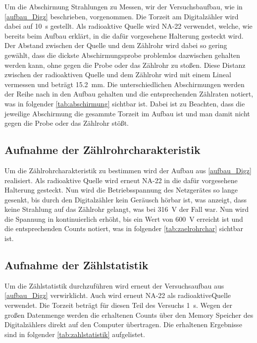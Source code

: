 \documentclass[12pt,english,ngerman]{scrartcl}
\begin{document}
Um die Abschirmung Strahlungen zu Messen, wir der Versuchsbaufbau, wie in \autoref{aufbau_Digz} beschrieben, vorgenommen. 
Die Torzeit am Digitalzähler wird dabei auf \SI{10}{\second} gestellt. Als radioaktive Quelle wird NA-22 verwendet, welche, wie 
bereits beim Aufbau erklärt, in die dafür vorgesehene Halterung gesteckt wird. Der Abstand zwischen der Quelle und dem Zählrohr
wird dabei so gering gewählt, dass die dickste Abschirmungsprobe problemlos dazwischen gehalten werden kann, ohne gegen
die Probe oder das Zählrohr zu stoßen. Diese Distanz zwischen der radioaktiven Quelle und dem Zählrohr wird mit einem Lineal
vermessen und beträgt \SI{15,2}{\mm}. Die unterschiedlichen Abschirmungen werden der Reihe nach in den Aufbau gehalten und die 
entsprechenden Zählraten notiert, was in folgender \autoref{tab:abschirmung} sichtbar ist. Dabei ist zu Beachten, dass die 
jeweilige Abschirmung die gesammte Torzeit im Aufbau ist und man damit nicht gegen die Probe oder das Zählrohr stößt.


\subsection{Aufnahme der Zählrohrcharakteristik}

Um die Zählrohrcharakteristik zu bestimmen wird der Aufbau aus \autoref{aufbau_Digz} realisiert.
Als radioaktive Quelle wird erneut NA-22 in die dafür vorgesehene Halterung gesteckt. Nun wird die Betriebsspannung des
Netzgerätes so lange gesenkt, bis durch den Digitalzähler kein Geräusch hörbar ist, was anzeigt, dass keine Strahlung auf das 
Zählrohr gelangt, was bei \SI{316}{V} der Fall war. Nun wird die Spannung in kontinuierlich erhöht, bis ein Wert von 
\SI{600}{V} erreicht ist und die entsprechenden Counts
notiert, was in folgender \autoref{tab:zaelrohrchar} sichtbar ist.



\subsection{Aufnahme der Zählstatistik}

Um die Zählstatistik durchzuführen wird erneut der Versuchsaufbau aus \autoref{aufbau_Digz} verwirklicht. Auch wird erneut
NA-22 als radioaktiveQuelle verwendet.
Die Torzeit beträgt für diesen Teil des Versuchs \SI{1}{s}. Wegen der großen Datenmenge werden die erhaltenen Counts über den
Memory Speicher des Digitalzählers direkt auf den Computer übertragen. Die erhaltenen Ergebnisse sind in folgender 
\autoref{tab:zahlstatistik} aufgelistet.
\end{document}
